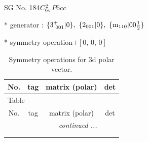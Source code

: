 \documentclass[fleqn,8pt]{jsarticle}
\begin{document}
\setcounter{MaxMatrixCols}{32}

\renewcommand{\tablename}{Table~}
\renewcommand{\figurename}{Figure~}
\begin{center}
\LARGE
SG No. 184\quad$C_{\rm 6v}^{2}$\quad$P6cc$\quad[ hexagonal ]
\end{center}

* generator : $\{3^{+}_{\,\,001}|0\},\,\,\{2{}_{001}|0\},\,\,\{{\rm m}_{110}|0 0 \frac{1}{2}\}$

* symmetry operation\quad$+\left[ 0,\, 0,\, 0 \right]$
\renewcommand{\arraystretch}{1.3}
\begin{longtable}{cccc}
\caption{Symmetry operations for 3d polar vector.}
 \\
 \hline \hline
No. & tag & matrix (polar) & det \\ \hline \endfirsthead

\multicolumn{3}{l}{\tablename\ \thetable{}} \\
 \hline \hline
No. & tag & matrix (polar) & det \\ \hline \endhead

 \hline \hline
\multicolumn{3}{r}{\footnotesize\it continued ...} \\ \endfoot

 \hline \hline
\multicolumn{3}{r}{} \\ \endlastfoot


\end{longtable}
\end{document}
